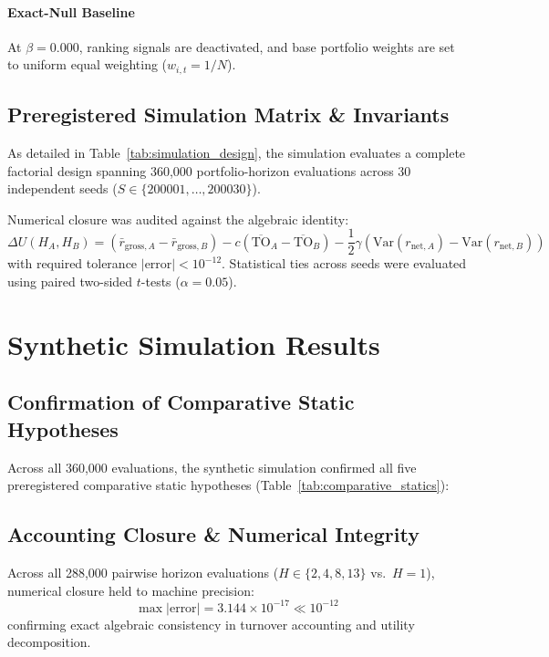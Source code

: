 \documentclass[11pt,a4paper]{article}
\theoremstyle{definition}
\begin{document}
\paragraph{Exact-Null Baseline}
At $\beta = 0.000$, ranking signals are deactivated, and base portfolio weights are set to uniform equal weighting ($w_{i,t} = 1/N$).

\subsection{Preregistered Simulation Matrix \& Invariants}
As detailed in Table~\ref{tab:simulation_design}, the simulation evaluates a complete factorial design spanning 360,000 portfolio-horizon evaluations across 30 independent seeds ($S \in \{200001, \dots, 200030\}$).

Numerical closure was audited against the algebraic identity:
\begin{equation}
\Delta U(H_A, H_B) = (\bar{r}_{\text{gross}, A} - \bar{r}_{\text{gross}, B}) - c(\overline{\text{TO}}_A - \overline{\text{TO}}_B) - \frac{1}{2}\gamma(\text{Var}(r_{\text{net}, A}) - \text{Var}(r_{\text{net}, B}))
\end{equation}
with required tolerance $|\text{error}| < 10^{-12}$. Statistical ties across seeds were evaluated using paired two-sided $t$-tests ($\alpha = 0.05$).



\section{Synthetic Simulation Results}
\label{sec:results}

\subsection{Confirmation of Comparative Static Hypotheses}

Across all 360,000 evaluations, the synthetic simulation confirmed all five preregistered comparative static hypotheses (Table~\ref{tab:comparative_statics}):



\subsection{Accounting Closure \& Numerical Integrity}
Across all 288,000 pairwise horizon evaluations ($H \in \{2, 4, 8, 13\}$ vs.\ $H=1$), numerical closure held to machine precision:
\begin{equation}
\max |\text{error}| = 3.144 \times 10^{-17} \ll 10^{-12}
\end{equation}
confirming exact algebraic consistency in turnover accounting and utility decomposition.
\end{document}

